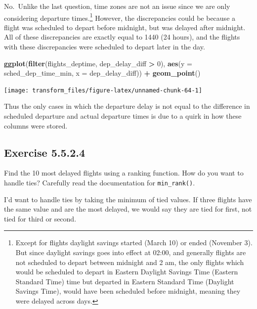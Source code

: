 \documentclass[]{book}
\newenvironment{Shaded}{\begin{snugshade}}{\end{snugshade}}
\newcommand{\DataTypeTok}[1]{\textcolor[rgb]{0.13,0.29,0.53}{#1}}
\newcommand{\DecValTok}[1]{\textcolor[rgb]{0.00,0.00,0.81}{#1}}
\newcommand{\KeywordTok}[1]{\textcolor[rgb]{0.13,0.29,0.53}{\textbf{#1}}}
\newcommand{\NormalTok}[1]{#1}
\newcommand{\OperatorTok}[1]{\textcolor[rgb]{0.81,0.36,0.00}{\textbf{#1}}}
\newcommand{\StringTok}[1]{\textcolor[rgb]{0.31,0.60,0.02}{#1}}
\let\rmarkdownfootnote\footnote%
\def\footnote{\protect\rmarkdownfootnote}
\theoremstyle{plain}
\theoremstyle{remark}
\begin{document}
No.~Unlike the last question, time zones are not an issue since we are only
considering departure times.\footnote{Except for flights daylight savings started (March 10) or
  ended (November 3). But since daylight savings goes into effect at 02:00,
  and generally flights are not scheduled to depart between midnight and 2 am,
  the only flights which would be scheduled to depart in Eastern Daylight Savings Time (Eastern Standard Time) time but departed in Eastern Standard Time (Daylight Savings Time), would have been scheduled before midnight, meaning they were delayed across days.}
However, the discrepancies could be because a flight was scheduled to depart
before midnight, but was delayed after midnight.
All of these discrepancies are exactly equal to 1440 (24 hours), and the flights with these discrepancies were scheduled to depart later in the day.

\begin{Shaded}
\begin{Highlighting}[]
\KeywordTok{ggplot}\NormalTok{(}\KeywordTok{filter}\NormalTok{(flights_deptime, dep_delay_diff }\OperatorTok{>}\StringTok{ }\DecValTok{0}\NormalTok{), }
       \KeywordTok{aes}\NormalTok{(}\DataTypeTok{y =}\NormalTok{ sched_dep_time_min, }\DataTypeTok{x =}\NormalTok{ dep_delay_diff)) }\OperatorTok{+}
\StringTok{  }\KeywordTok{geom_point}\NormalTok{()}
\end{Highlighting}
\end{Shaded}

\begin{center}\texttt{[image: transform\_files/figure-latex/unnamed-chunk-64-1]} \end{center}

Thus the only cases in which the departure delay is not equal to the difference
in scheduled departure and actual departure times is due to a quirk in how these
columns were stored.

\hypertarget{exercise-5.5.2.4}{%
\subsection*{\texorpdfstring{Exercise {5.5.2.4}}{Exercise 5.5.2.4}}\label{exercise-5.5.2.4}}

Find the 10 most delayed flights using a ranking function. How do you want to handle ties? Carefully read the documentation for \texttt{min\_rank()}.

I'd want to handle ties by taking the minimum of tied values. If three flights
have the same value and are the most delayed, we would say they are tied for
first, not tied for third or second.
\end{document}
